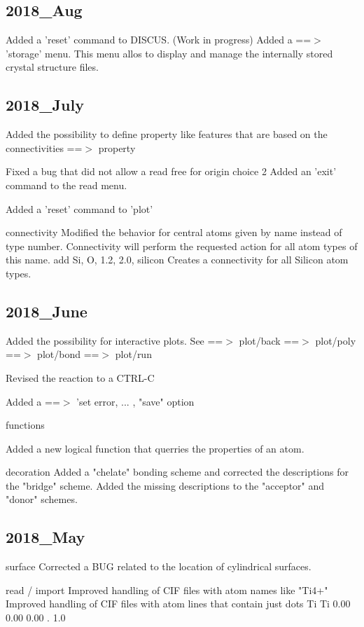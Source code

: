 \subsection*{2018\_Aug}
\par
Added a 'reset' command to DISCUS. (Work in progress) 
Added a ==$> $ 'storage' menu. 
   This menu allos to display and manage the internally stored 
   crystal structure files. 
\subsection*{2018\_July}
\par
Added the possibility to define property like features 
that are based on the connectivities ==$> $ property 
\par
Fixed a bug that did not allow a read free for origin choice 2 
Added an 'exit' command to the read menu. 
\par
Added a 'reset' command to 'plot' 
\par
connectivity 
   Modified the behavior for central atoms given by name 
   instead of type number. Connectivity will perform the 
   requested action for all atom types of this name. 
   add Si, O, 1.2, 2.0, silicon 
   Creates a connectivity for all Silicon atom types. 
\par
\subsection*{2018\_June}
\par
Added the possibility for interactive plots. 
See ==$> $ plot/back 
    ==$> $ plot/poly 
    ==$> $ plot/bond 
    ==$> $ plot/run 
\par
Revised the reaction to a CTRL-C 
\par
Added a ==$> $ 'set error, ... , "save" option 
\par
functions 
\par
Added a new logical function that querries the properties of an atom. 
\par
decoration 
Added a "chelate" bonding scheme and corrected the descriptions 
for the "bridge" scheme. 
Added the missing descriptions to the "acceptor" and "donor" 
schemes. 
\subsection*{2018\_May}
\par
surface 
Corrected a BUG related to the location of cylindrical surfaces. 
\par
read / import 
Improved handling of CIF files with atom names like "Ti4+" 
Improved handling of CIF files with atom lines that contain 
just dots 
Ti Ti 0.00 0.00 0.00 . 1.0 
